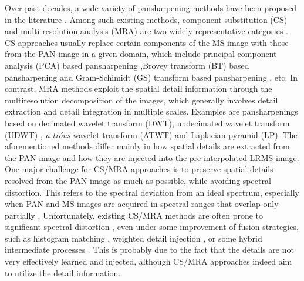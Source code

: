 \documentclass[journal]{IEEEtran}
\begin{document}
Over past decades, a wide variety of pansharpening methods have been proposed in the literature \cite{Survey:Vivone2015,Survey:Loncan2015,Survey:Alparone2007,Aiazzi2002Context}. Among such existing methods, component substitution (CS) and multi-resolution analysis (MRA) are two widely representative categories \cite{Survey:Vivone2015,Survey:Loncan2015,Survey:Alparone2007}. CS approaches usually replace certain components of the MS image with those from the PAN image in a given domain, which include principal component analysis (PCA) based pansharpening \cite{PCA:Jr1989,Shettigara1992A,Shah2008An},Brovey transform (BT) based pansharpening \cite{Brovey:Gillespie1987,Brovey:Tu2001} and Gram-Schimidt (GS) transform based pansharpening \cite{GS:Laben2000,GS:Aiazzi2007}, etc. In contrast, MRA methods exploit the spatial detail information through the multiresolution decomposition of the images, which generally involves detail extraction and detail integration in multiple scales. Examples are pansharpenings based on decimated wavelet transform (DWT)\cite{DWT:Khan2008}, undecimated wavelet transform (UDWT) \cite{Nason1995The}, \textit{a tr\'ous} wavelet transform (ATWT)\cite{ATWT:Ranchin2000,AWLP:Otazu2005,WDT:Vivone2014} and Laplacian pyramid (LP)\cite{MTF:Aiazzi2003,MTF:Aiazzi2006,MTF:Lee2010}. The aforementioned methods differ mainly in how spatial details are extracted from the PAN image and how they are injected into the pre-interpolated LRMS image. One major challenge for CS/MRA approaches is to preserve spatial details resolved from the PAN image as much as possible, while avoiding spectral distortion. This refers to the spectral deviation from an ideal spectrum, especially when PAN and MS images are acquired in spectral ranges that overlap only partially \cite{CNN-Pansharp:Masi2016,Survey:Vivone2015}. Unfortunately, existing CS/MRA methods are often prone to significant spectral distortion \cite{Survey:Loncan2015}, even under some improvement of fusion strategies, such as histogram matching \cite{Histogram:Thomas2008}, weighted detail injection \cite{WDT:Vivone2014}, or some hybrid intermediate processes \cite{GFPCA:Liao2015}. This is probably due to the fact that the details are not very effectively learned and injected, although CS/MRA approaches indeed aim to utilize the detail information.
\end{document}

